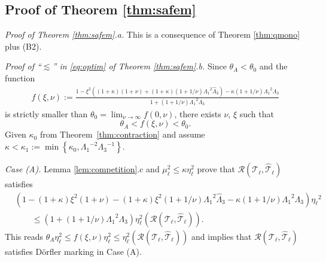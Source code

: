 \documentclass{siamltex1213}
\begin{document}
\subsection{Proof of Theorem \ref{thm:safem}}\label{Subsectionname=ProofofTheorem}

\textit{Proof of Theorem \ref{thm:safem}.a.}
This is a consequence of Theorem \ref{thm:qmono} plus (B2).
\qquad \endproof

\textit{Proof of ``$\lesssim $'' in \eqref{eq:optim} of Theorem \ref{thm:safem}.b.}
	Since $\theta_A<\theta_0$ and the function 
	\begin{align*}
		f(\xi,\nu):=\frac{1 -\xi^2\left((1+\kappa)(1+\nu)+ (1+\kappa)(1+1/\nu){\ensuremath{\Lambda_{\mathrm{1}}}}^2{\ensuremath{\widehat{\Lambda}_{\mathrm{3}}}}\right) -\kappa (1+1/\nu){\ensuremath{\Lambda_{\mathrm{1}}}}^2{\ensuremath{\Lambda_{\mathrm{3}}}}}{1+( 1+1/\nu){\ensuremath{\Lambda_{\mathrm{1}}}}^2{\ensuremath{\Lambda_{\mathrm{3}}}}}
	\end{align*}
	is strictly smaller than $\theta_0=\lim_{\nu \to \infty} f(0,\nu)$, there exists 
	$\nu$, $\xi$ such that 
	\[\theta_A< f(\xi,\nu)< \theta_0. \]
	Given $\kappa_0$ from Theorem~\ref{thm:contraction} and assume 
	$\kappa<\kappa_1:=\min\left\lbrace\kappa_0,{\ensuremath{\Lambda_{\mathrm{1}}}}^{-2}{\ensuremath{\Lambda_{\mathrm{3}}}}^{-1}\right\rbrace$.

\textit{Case (A).} 
	Lemma \ref{lem:competition}.c and $\mu_\ell^2 \leq \kappa \eta_\ell^2$  prove 
	that $\mathcal R({\mathcal T_{\ell}}, {\hat{\mathcal{T}}_{\ell}})$ satisfies 
		\begin{align*}
	 		&\left( 1 -(1+\kappa)\xi^2(1+\nu)- (1+\kappa)\xi^2(1+1/\nu){\ensuremath{\Lambda_{\mathrm{1}}}}^2{\ensuremath{\widehat{\Lambda}_{\mathrm{3}}}} -\kappa  (1+1/\nu){\ensuremath{\Lambda_{\mathrm{1}}}}^2{\ensuremath{\Lambda_{\mathrm{3}}}}\right){\eta_{{\ell}}}^2 \\
			&\qquad \leq  
		\left(1+( 1+1/\nu){\ensuremath{\Lambda_{\mathrm{1}}}}^2{\ensuremath{\Lambda_{\mathrm{3}}}}\right) \eta^2_\ell( \mathcal R({\mathcal T_{\ell}}, {\hat{\mathcal{T}}_{\ell}})).
		\end{align*}
		This reads $\theta_A\eta_\ell^2 \le  f(\xi,\nu)\eta_\ell^2\le \eta^2_\ell( \mathcal R({\mathcal T_{\ell}}, {\hat{\mathcal{T}}_{\ell}}))$ and 
 implies  that $\mathcal R({\mathcal T_{\ell}}, {\hat{\mathcal{T}}_{\ell}})$ satisfies D\"orfler
		marking in Case (A). 
		
\end{document}
